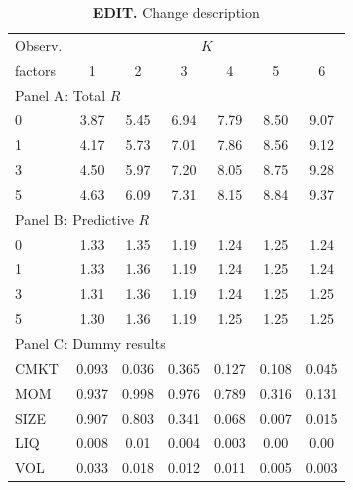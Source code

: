 \documentclass[
  12pt,
  a4paper,
  openany]{scrbook}
\begin{document}
\begin{table}
\centering
\small
\caption[EDIT]%
{%
\textbf{EDIT.}
Change description
}
\label{tbl-model_comparison}
\vspace{5pt} %
\begin{tabular}{lcccccc}
\toprule
\multicolumn{1}{c}{Observ.} & \multicolumn{6}{c}{$K$} \\
\cmidrule(lr){2-7}
factors & 1 & 2 & 3 & 4 & 5 & 6 \\
\midrule
\multicolumn{7}{l}{Panel A: Total $R$} \\
\midrule
0 & 3.87 & 5.45 & 6.94 & 7.79 & 8.50 & 9.07 \\ 
1 & 4.17 & 5.73 & 7.01 & 7.86 & 8.56 & 9.12 \\
3 & 4.50 & 5.97 & 7.20 & 8.05 & 8.75 & 9.28 \\
5 & 4.63 & 6.09 & 7.31 & 8.15 & 8.84 & 9.37 \\
\midrule
\multicolumn{7}{l}{Panel B: Predictive $R$} \\
\midrule
0 & 1.33 & 1.35 & 1.19 & 1.24 & 1.25 & 1.24 \\
1 & 1.33 & 1.36 & 1.19 & 1.24 & 1.25 & 1.24 \\
3 & 1.31 & 1.36 & 1.19 & 1.24 & 1.25 & 1.25 \\
5 & 1.30 & 1.36 & 1.19 & 1.25 & 1.25 & 1.25 \\
\midrule
\multicolumn{7}{l}{Panel C: Dummy results} \\
\midrule
CMKT & 0.093 & 0.036 & 0.365 & 0.127 & 0.108 & 0.045 \\
MOM & 0.937 & 0.998 & 0.976 & 0.789 & 0.316 & 0.131 \\
SIZE & 0.907 & 0.803 & 0.341 & 0.068 & 0.007 & 0.015 \\
LIQ & 0.008 & 0.01 & 0.004 & 0.003 & 0.00 & 0.00 \\
VOL & 0.033 & 0.018 & 0.012 & 0.011 & 0.005 & 0.003 \\
\bottomrule
\end{tabular}
\end{table}
\end{document}
